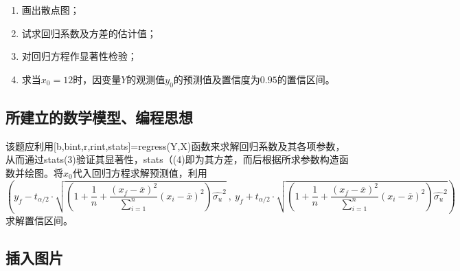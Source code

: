 \documentclass[UTF8,12pt,a4paper]{article}
\begin{document}
\begin{enumerate}
	\item 画出散点图；
	\item 试求回归系数及方差的估计值；
	\item 对回归方程作显著性检验；
	\item 求当$x_0=12$时，因变量$Y$的观测值$y_0$的预测值及置信度为$0.95$的置信区间。
\end{enumerate}

\subsection{所建立的数学模型、编程思想}
该题应利用[b,bint,r,rint,stats]=regress(Y,X)函数来求解回归系数及其各项参数，从而通过stats(3)验证其显著性，stats（(4)即为其方差，而后根据所求参数构造函数并绘图。将$x_0$代入回归方程求解预测值，利用
\begin{equation*}
\scriptstyle\left(y_f-t_{\alpha/2}\cdot\sqrt{\left(1+\dfrac{1}{n}+\dfrac{{\left(x_f-\overline{x}\right)}^2}{\sum_{i=1}^{n}}{{(x_i-\overline{x})}^2}\right)\hat{\sigma_u}^2}\ ,\ y_f+t_{\alpha/2}\cdot\sqrt{\left(1+\dfrac{1}{n}+\dfrac{{\left(x_f-\overline{x}\right)}^2}{\sum_{i=1}^{n}}{{(x_i-\overline{x})}^2}\right)\hat{\sigma_u}^2}\right)
\end{equation*}
求解置信区间。

\subsection{插入图片}
\end{document}
